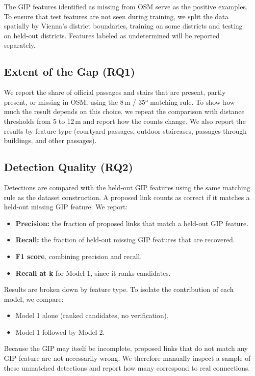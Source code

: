 \documentclass[conference]{IEEEtran}
\begin{document}
The GIP features identified as missing from OSM serve as the positive examples. To ensure that test features are not seen during training, we split the data spatially by Vienna's district boundaries, training on some districts and testing on held-out districts. Features labeled as undetermined will be reported separately.

\subsection{Extent of the Gap (RQ1)}

We report the share of official passages and stairs that are present, partly present, or missing in OSM, using the 8\,m / 35° matching rule. To show how much the result depends on this choice, we repeat the comparison with distance thresholds from 5 to 12\,m and report how the counts change. We also report the results by feature type (courtyard passages, outdoor staircases, passages through buildings, and other passages).

\subsection{Detection Quality (RQ2)}

Detections are compared with the held-out GIP features using the same matching rule as the dataset construction. A proposed link counts as correct if it matches a held-out missing GIP feature. We report:
\begin{itemize}
\item \textbf{Precision:} the fraction of proposed links that match a held-out GIP feature.
\item \textbf{Recall:} the fraction of held-out missing GIP features that are recovered.
\item \textbf{F1 score}, combining precision and recall.
\item \textbf{Recall at k} for Model 1, since it ranks candidates.
\end{itemize}
Results are broken down by feature type. To isolate the contribution of each model, we compare:
\begin{itemize}
\item Model 1 alone (ranked candidates, no verification),
\item Model 1 followed by Model 2.
\end{itemize}
Because the GIP may itself be incomplete, proposed links that do not match any GIP feature are not necessarily wrong. We therefore manually inspect a sample of these unmatched detections and report how many correspond to real connections.
\end{document}
